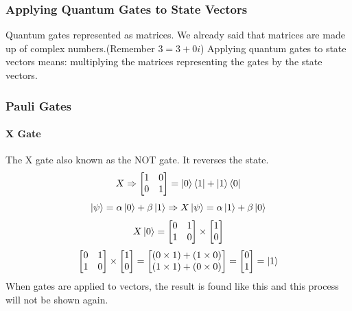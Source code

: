 \documentclass{article}
\begin{document}
\subsubsection{Applying Quantum Gates to State Vectors}
Quantum gates represented as matrices. We already said that matrices are made up of complex numbers.(Remember $3 = 3+0i$) Applying quantum gates to state vectors means: multiplying the matrices representing the gates by the state vectors.
\subsubsection{Pauli Gates}
\paragraph{X Gate}
The X gate also known as the NOT gate. It reverses the state.
\begin{equation*}
    X \Rightarrow \begin{bmatrix} 1 & 0 \\ 0 & 1\end{bmatrix} = \ket{0}\bra{1} + \ket{1}\bra{0}
\end{equation*}
\begin{equation*}
  \ket{\psi} = \alpha\ket{0} + \beta\ket{1} \Rightarrow X\ket{\psi} = \alpha\ket{1} + \beta\ket{0}
\end{equation*}
\begin{equation*}
X \ket{0} = \begin{bmatrix} 0 & 1 \\ 1 & 0 \end{bmatrix} \times \begin{bmatrix} 1 \\ 0 \end{bmatrix}
\end{equation*}
\begin{equation*}
\begin{bmatrix} 0 & 1 \\ 1 & 0 \end{bmatrix} \times \begin{bmatrix} 1 \\ 0 \end{bmatrix}
=
\begin{bmatrix}
(0 \times 1) + (1 \times 0) \\
(1 \times 1) + (0 \times 0)
\end{bmatrix}
=
\begin{bmatrix}
0 \\
1
\end{bmatrix} = \ket{1}
\end{equation*}
When gates are applied to vectors, the result is found like this and this process will not be shown again.
\end{document}
